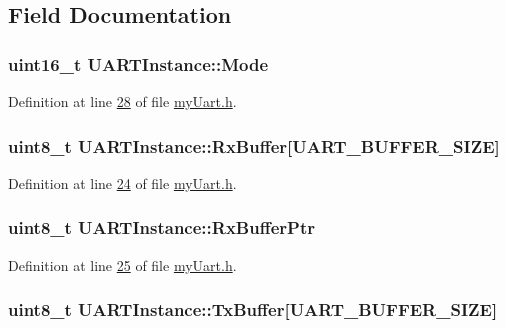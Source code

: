 \subsection{Field Documentation}
\hypertarget{struct_u_a_r_t_instance_a6cdb50e2027bf68b7ad66e2863c1ae29}{
\subsubsection[{Mode}]{\setlength{\rightskip}{0pt plus 5cm}uint16\-\_\-t U\-A\-R\-T\-Instance\-::\-Mode}}\label{struct_u_a_r_t_instance_a6cdb50e2027bf68b7ad66e2863c1ae29}


Definition at line \hyperlink{my_uart_8h_source_l00028}{28} of file \hyperlink{my_uart_8h_source}{my\-Uart.\-h}.

\hypertarget{struct_u_a_r_t_instance_a19e526bc57bbb10939b53ea13eee30fa}{
\subsubsection[{Rx\-Buffer}]{\setlength{\rightskip}{0pt plus 5cm}uint8\-\_\-t U\-A\-R\-T\-Instance\-::\-Rx\-Buffer\mbox{[}{\bf U\-A\-R\-T\-\_\-\-B\-U\-F\-F\-E\-R\-\_\-\-S\-I\-Z\-E}\mbox{]}}}\label{struct_u_a_r_t_instance_a19e526bc57bbb10939b53ea13eee30fa}


Definition at line \hyperlink{my_uart_8h_source_l00024}{24} of file \hyperlink{my_uart_8h_source}{my\-Uart.\-h}.

\hypertarget{struct_u_a_r_t_instance_a207dabce7103416b36680d9ecc050684}{
\subsubsection[{Rx\-Buffer\-Ptr}]{\setlength{\rightskip}{0pt plus 5cm}uint8\-\_\-t U\-A\-R\-T\-Instance\-::\-Rx\-Buffer\-Ptr}}\label{struct_u_a_r_t_instance_a207dabce7103416b36680d9ecc050684}


Definition at line \hyperlink{my_uart_8h_source_l00025}{25} of file \hyperlink{my_uart_8h_source}{my\-Uart.\-h}.

\hypertarget{struct_u_a_r_t_instance_a77d9f6986b01073dd0d2385d2e34f961}{
\subsubsection[{Tx\-Buffer}]{\setlength{\rightskip}{0pt plus 5cm}uint8\-\_\-t U\-A\-R\-T\-Instance\-::\-Tx\-Buffer\mbox{[}{\bf U\-A\-R\-T\-\_\-\-B\-U\-F\-F\-E\-R\-\_\-\-S\-I\-Z\-E}\mbox{]}}}\label{struct_u_a_r_t_instance_a77d9f6986b01073dd0d2385d2e34f961}


